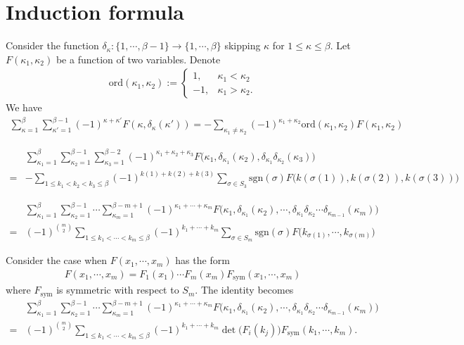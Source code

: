 \documentclass{amsart}
\begin{document}
\section{Induction formula}
{
    Consider the function $\delta_\kappa:\{1,\cdots,\beta-1\}\to\{1,\cdots,\beta\}$ skipping $\kappa$ for $1\leq \kappa\leq\beta$. Let $F(\kappa_1,\kappa_2)$ be a function of two variables. Denote 
    \begin{align*}
        \mathrm{ord}(\kappa_1,\kappa_2):=\begin{cases}
            1,&\kappa_1<\kappa_2\\
            -1,&\kappa_1>\kappa_2. 
        \end{cases}
    \end{align*}
    We have 
    \begin{align*}
        \sum_{\kappa=1}^\beta\sum_{\kappa'=1}^{\beta-1}(-1)^{\kappa+\kappa'}F(\kappa,\delta_\kappa(\kappa'))=-\sum_{\kappa_1\ne\kappa_2}(-1)^{\kappa_1+\kappa_2}\mathrm{ord}(\kappa_1,\kappa_2)F(\kappa_1,\kappa_2)
    \end{align*}

    \begin{align*}
        &\sum_{\kappa_1=1}^\beta\sum_{\kappa_2=1}^{\beta-1}\sum_{\kappa_3=1}^{\beta-2}(-1)^{\kappa_1+\kappa_2+\kappa_3}F\big(\kappa_1,\delta_{\kappa_1}(\kappa_2),\delta_{\kappa_1}\delta_{\kappa_2}(\kappa_3)\big)\\
        =&-\sum_{1\leq k_1<k_2<k_3\leq \beta}(-1)^{k(1)+k(2)+k(3)}\sum_{\sigma\in S_3}\mathrm{sgn}(\sigma)F\big(k(\sigma(1)),k(\sigma(2)),k(\sigma(3))\big)
    \end{align*}

    \begin{align*}
        &\sum_{\kappa_1=1}^\beta\sum_{\kappa_2=1}^{\beta-1}\cdots\sum_{\kappa_m=1}^{\beta-m+1}(-1)^{\kappa_1+\cdots+\kappa_m}F\Big(\kappa_1,\delta_{\kappa_1}(\kappa_2),\cdots,\delta_{\kappa_1}\delta_{\kappa_2}\cdots\delta_{\kappa_{m-1}}(\kappa_m)\Big)\\
        ={}&(-1)^{\binom{m}{2}}\sum_{1\leq k_1<\cdots<k_m\leq \beta}(-1)^{k_1+\cdots+k_m}\sum_{\sigma\in S_m}\mathrm{sgn}(\sigma)F\Big(k_{\sigma(1)},\cdots,k_{\sigma(m)}\Big)
    \end{align*}

    Consider the case when $F(x_1,\cdots,x_m)$ has the form 
    \begin{align*}
        F(x_1,\cdots,x_m)=F_1(x_1)\cdots F_m(x_m) F_{\mathrm{sym}}(x_1,\cdots,x_m)
    \end{align*}
    where $F_{\mathrm{sym}}$ is symmetric with respect to $S_m$. The identity becomes 
    \begin{align*}
        &\sum_{\kappa_1=1}^\beta\sum_{\kappa_2=1}^{\beta-1}\cdots\sum_{\kappa_m=1}^{\beta-m+1}(-1)^{\kappa_1+\cdots+\kappa_m}F\Big(\kappa_1,\delta_{\kappa_1}(\kappa_2),\cdots,\delta_{\kappa_1}\delta_{\kappa_2}\cdots\delta_{\kappa_{m-1}}(\kappa_m)\Big)\\
        ={}&(-1)^{\binom{m}{2}}\sum_{1\leq k_1<\cdots<k_m\leq \beta}(-1)^{k_1+\cdots+k_m}\det\big(F_i(k_j)\big)F_{\mathrm{sym}}(k_1,\cdots,k_m). 
    \end{align*}
}
\end{document}
